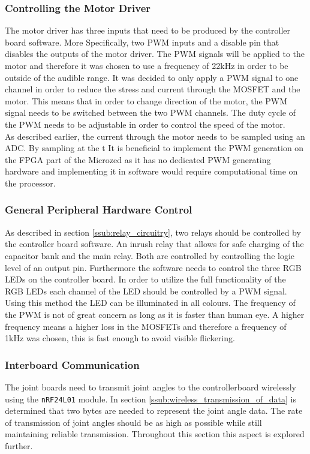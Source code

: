 \subsubsection{Controlling the Motor Driver} %
\label{ssub:controlling_the_motor_driver}
The motor driver has three inputs that need to be produced by the controller board software.
More Specifically, two PWM inputs and a disable pin that disables the outputs of the motor driver.
The PWM signals will be applied to the motor and therefore it was chosen to use a frequency of 22kHz in order to be outside of the audible range.
It was decided to only apply a PWM signal to one channel in order to reduce the stress and current through the MOSFET and the motor.
This means that in order to change direction of the motor, the PWM signal needs to be switched between the two PWM channels.
The duty cycle of the PWM needs to be adjustable in order to control the speed of the motor.
\\
As described earlier, the current through the motor needs to be sampled using an ADC. 
By sampling at the t
It is beneficial to implement the PWM generation on the FPGA part of the Microzed as it has no dedicated PWM generating hardware and implementing it in software would require computational time on the processor.

\subsubsection{General Peripheral Hardware Control} %
\label{ssub:general_peripheral_hardware}
As described in section \ref{ssub:relay_circuitry}, two relays should be controlled by the controller board software. 
An inrush relay that allows for safe charging of the capacitor bank and the main relay. 
Both are controlled by controlling the logic level of an output pin.
Furthermore the software needs to control the three RGB LEDs on the controller board. 
In order to utilize the full functionality of the RGB LEDs each channel of the LED should be controlled by a PWM signal.
Using this method the LED can be illuminated in all colours.
The frequency of the PWM is not of great concern as long as it is faster than human eye. 
A higher frequency means a higher loss in the MOSFETs and therefore a frequency of 1kHz was chosen, this is fast enough to avoid visible flickering.

\subsubsection{Interboard Communication} %
\label{ssub:interboard_communication}
The joint boards need to transmit joint angles to the controllerboard wirelessly using the \texttt{nRF24L01} module.
In section  \ref{ssub:wireless_transmission_of_data} is determined that two bytes are needed to represent the joint angle data.
The rate of transmission of joint angles should be as high as possible while still maintaining reliable transmission.
Throughout this section this aspect is explored further.

